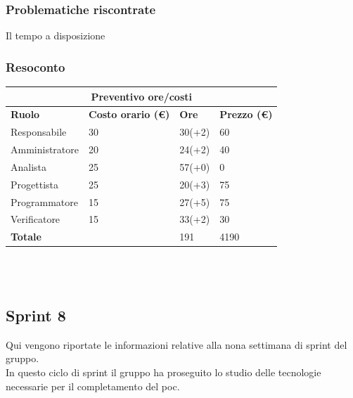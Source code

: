 \documentclass[10pt]{article}
\begin{document}
\subsubsection{Problematiche riscontrate}
Il tempo a disposizione

\subsubsection{Resoconto}
\begin{center}
	\begin{tabularx}{\textwidth}{|X|X|X|X|}
		\hline
		\multicolumn{4}{|c|}{\textbf{Preventivo ore/costi}}                                      \\
		\hline
		\hline
		\textbf{Ruolo}  & \textbf{Costo orario (\euro)} & \textbf{Ore} & \textbf{Prezzo (\euro)} \\
		\hline
		Responsabile    & 30                            & 30(+2)       & 60                      \\
		\hline
		Amministratore  & 20                            & 24(+2)       & 40                      \\
		\hline
		Analista        & 25                            & 57(+0)       & 0                       \\
		\hline
		Progettista     & 25                            & 20(+3)       & 75                      \\
		\hline
		Programmatore   & 15                            & 27(+5)       & 75                      \\
		\hline
		Verificatore    & 15                            & 33(+2)       & 30                      \\
		\hline
		\hline
		\textbf{Totale} &                               & 191          & 4190                    \\
		\hline
	\end{tabularx}\\[8pt]
	\mbox{}\\
\end{center}

\subsection{Sprint 8}
Qui vengono riportate le informazioni relative alla nona settimana di sprint del gruppo. \\
In questo ciclo di sprint il gruppo ha proseguito lo studio delle tecnologie necessarie per il completamento del poc. \\
\end{document}
